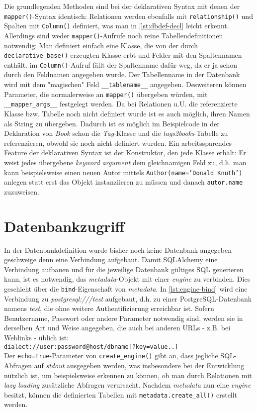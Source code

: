 Die grundlegenden Methoden sind bei der deklarativen Syntax mit denen der
\texttt{mapper()}-Syntax identisch: Relationen werden ebenfalls mit
\texttt{relationship()} und Spalten mit \texttt{Column()} definiert, was man in
\autoref{lst:dbdef-decl} leicht erkennt.
Allerdings sind weder \texttt{mapper()}-Aufrufe noch reine Tabellendefinitionen
notwendig: Man definiert einfach eine Klasse, die von der durch
\texttt{declarative\_base()} erzeugten Klasse erbt und Felder mit den
Spaltennamen enthält. im \texttt{Column()}-Aufruf fällt der Spaltenname dafür
weg, da er ja schon durch den Feldnamen angegeben wurde. Der Tabellenname in der
Datenbank wird mit dem "magischen" Feld \texttt{\_\_tablename\_\_} angegeben.
Desweiteren können Parameter, die normalerweise an \texttt{mapper()} übergeben
würden, mit \texttt{\_\_mapper\_args\_\_} festgelegt werden.
Da bei Relationen u.U. die referenzierte Klasse bzw. Tabelle noch nicht definiert
wurde ist es auch möglich, ihren Namen als String zu übergeben. Dadurch ist es
möglich im Beispielcode in der Deklaration von \emph{Book} schon die
\emph{Tag}-Klasse und die \emph{tags2books}-Tabelle zu referenzieren, obwohl sie
noch nicht definiert wurden.
Ein arbeitssparendes Feature der deklarativen Syntax ist der Konstruktor, den
jede Klasse erhält: Er weist jedes übergebene \textit{keyword argument} dem
gleichnamigen Feld zu, d.h. man kann beispielsweise einen neuen Autor mittels
\texttt{Author(name='Donald Knuth')} anlegen statt erst das Objekt instanziieren
zu müssen und danach \texttt{autor.name} zuzuweisen.




\section{Datenbankzugriff}

In der Datenbankdefinition wurde bisher noch keine Datenbank angegeben
geschweige denn eine Verbindung aufgebaut. Damit SQLAlchemy eine Verbindung
aufbauen und für die jeweilige Datenbank gültiges SQL generieren kann, ist es
notwendig, das \emph{metadata}-Objekt mit einer \emph{engine} zu verbinden. Dies
geschieht über die \texttt{bind}-Eigenschaft von \emph{metadata}. In
\autoref{lst:engine-bind} wird eine Verbindung zu \emph{postgresql:///test}
aufgebaut, d.h. zu einer PostgreSQL-Datenbank namens \emph{test}, die ohne
weitere Authentifizierung erreichbar ist. Sofern Benutzername, Passwort oder
andere Parameter notwendig sind, werden sie in derselben Art und Weise
angegeben, die auch bei anderen URLs - z.B. bei Weblinks - üblich ist: \\
\texttt{dialect://user:password@host/dbname[?key=value..]} \\
Der \texttt{echo=True}-Parameter von \texttt{create\_engine()} gibt an, dass
jegliche SQL-Abfragen auf \emph{stdout} ausgegeben werden, was insbesondere bei
der Entwicklung nützlich ist, um beispielsweise erkennen zu können, ob man
durch Relationen mit \emph{lazy loading} zusätzliche Abfragen verursacht.
Nachdem \emph{metadata} nun eine \emph{engine} besitzt, können die definierten
Tabellen mit \texttt{metadata.create\_all()} erstellt werden.

